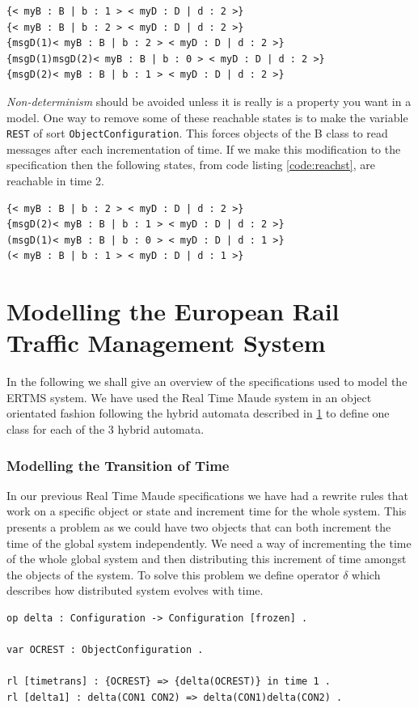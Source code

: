 \begin{lstlisting}[caption = Some of the states reachable by rewriting EXAMPLE1 in two time steps, label = code:reachst ]
{< myB : B | b : 1 > < myD : D | d : 2 >}
{< myB : B | b : 2 > < myD : D | d : 2 >}
{msgD(1)< myB : B | b : 2 > < myD : D | d : 2 >}
{msgD(1)msgD(2)< myB : B | b : 0 > < myD : D | d : 2 >}
{msgD(2)< myB : B | b : 1 > < myD : D | d : 2 >}
\end{lstlisting}

\emph{Non-determinism} should be avoided unless it is really is a property you want in a model. One way to remove some of these reachable states is to make the variable \texttt{REST} of sort \texttt{ObjectConfiguration}. This forces objects of the B class to read messages after each incrementation of time. If we make this modification to the specification then the following states, from code listing \ref{code:reachst}, are reachable in time 2.
\begin{lstlisting}
{< myB : B | b : 2 > < myD : D | d : 2 >}
{msgD(2)< myB : B | b : 1 > < myD : D | d : 2 >}
(msgD(1)< myB : B | b : 0 > < myD : D | d : 1 >}
(< myB : B | b : 1 > < myD : D | d : 1 >}
\end{lstlisting}


\section{Modelling the European Rail Traffic Management System}
In the following we shall give an overview of the specifications used to model the ERTMS system. We have used the Real Time Maude system in an object orientated fashion following the hybrid automata described in \ref{} to define one class for each of the 3 hybrid automata.
\subsubsection*{Modelling the Transition of Time}
In our previous Real Time Maude specifications we have had a rewrite rules that work on a specific object or state and increment time for the whole system. This presents a problem as we could have two objects that can both increment the time of the global system independently. We need a way of incrementing the time of the whole global system and then distributing this increment of time amongst the objects of the system. To solve this problem we define operator $\delta$ which describes how distributed system evolves with time.

\begin{lstlisting}[caption = The delta time transition operation, label = code:delta]
op delta : Configuration -> Configuration [frozen] . 

var OCREST : ObjectConfiguration .

rl [timetrans] : {OCREST} => {delta(OCREST)} in time 1 .
rl [delta1] : delta(CON1 CON2) => delta(CON1)delta(CON2) .
\end{lstlisting}

